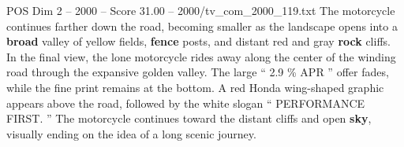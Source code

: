 \begin{textsample}{POS Dim 2 – 2000 – Score 31.00 – 2000/tv\_com\_2000\_119.txt}
The motorcycle continues farther down the road, becoming smaller as the landscape opens into a \textbf{broad} valley of yellow fields, \textbf{fence} posts, and distant red and gray \textbf{rock} cliffs.
In the final view, the lone motorcycle rides away along the center of the winding road through the expansive golden valley.
The large “ 2.9 \% APR ” offer fades, while the fine print remains at the bottom.
A red Honda wing-shaped graphic appears above the road, followed by the white slogan “ PERFORMANCE FIRST. ” The motorcycle continues toward the distant cliffs and open \textbf{sky}, visually ending on the idea of a long scenic journey.

\end{textsample}
